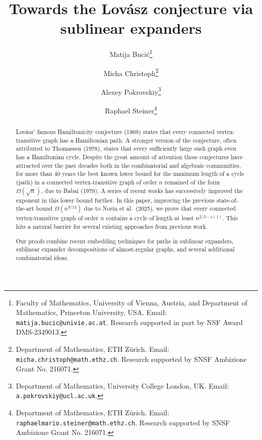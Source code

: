 \documentclass[11pt,reqno]{article}
\title{Towards the  Lov\'{a}sz conjecture via sublinear expanders}
\author{Matija Buci{\'c}\thanks{Faculty of Mathematics, University of Vienna, Austria, and Department of Mathematics, Princeton University, USA. Email: \texttt{matija.bucic@univie.ac.at}. Research supported in part by NSF Award DMS-2349013.} \and Micha Christoph\thanks{Department of Mathematics, ETH Z\"{u}rich. Email: \texttt{micha.christoph@math.ethz.ch}. Research supported by SNSF Ambizione Grant No. 216071. } \and Alexey Pokrovskiy\thanks{Department of Mathematics, University College London, UK. Email: \texttt{a.pokrovskiy@ucl.ac.uk}.} \and Raphael Steiner\thanks{Department of Mathematics, ETH Z\"{u}rich. Email: \texttt{raphaelmario.steiner@math.ethz.ch}. Research supported by SNSF Ambizione Grant No. 216071.}}
\begin{document}
\maketitle
\begin{abstract}
Lov\'{a}sz' famous Hamiltonicity conjecture (1969) states that every connected vertex-transitive graph has a Hamiltonian path. A stronger version of the conjecture, often attributed to Thomassen (1978), states that every sufficiently large such graph even has a Hamiltonian cycle. Despite the great amount of attention these conjectures have attracted over the past decades both in the combinatorial and algebraic communities, for more than 40 years the best known lower bound for the maximum length of a cycle (path) in a connected vertex-transitive graph of order $n$ remained of the form $\Omega(\sqrt{n})$, due to Babai (1979). A series of recent works has successively improved the exponent in this lower bound further. In this paper, improving the previous state-of-the-art bound $\Omega(n^{9/14})$ due to Norin et al.~(2025), we prove that every connected vertex-transitive graph of order $n$ contains a cycle of length at least $n^{2/3-o(1)}$. This hits a natural barrier for several existing approaches from previous work.

Our proofs combine recent embedding techniques for paths in sublinear expanders, sublinear expander decompositions of almost-regular graphs, and several additional combinatorial ideas.
\end{abstract}
\end{document}

